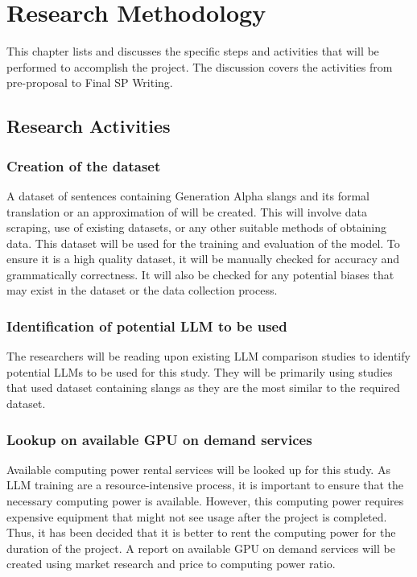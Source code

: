 \chapter{Research Methodology}
This chapter lists and discusses the specific steps and activities that will be performed  to accomplish the project. 
The discussion covers the activities from pre-proposal to Final SP Writing.

\section{Research Activities}
\subsection{Creation of the dataset} 
A dataset of sentences containing Generation Alpha slangs and its formal translation or an approximation of will be created.
This will involve data scraping, use of existing datasets, or any other suitable methods of obtaining data.
This dataset will be used for the training and evaluation of the model.
To ensure it is a high quality dataset, it will be manually checked for accuracy and grammatically correctness.
It will also be checked for any potential biases that may exist in the dataset or the data collection process.

\subsection{Identification of potential LLM to be used}
The researchers will be reading upon existing LLM comparison studies to identify potential LLMs to be used for this study.
They will be primarily using studies that used dataset containing slangs as they are the most similar to the required dataset.

\subsection{Lookup on available GPU on demand services} 
Available computing power rental services will be looked up for this study.
As LLM training are a resource-intensive process, it is important to ensure that the necessary computing power is available.
However, this computing power requires expensive equipment that might not see usage after the project is completed.
Thus, it has been decided that it is better to rent the computing power for the duration of the project.
A report on available GPU on demand services will be created using market research and price to computing power ratio.

